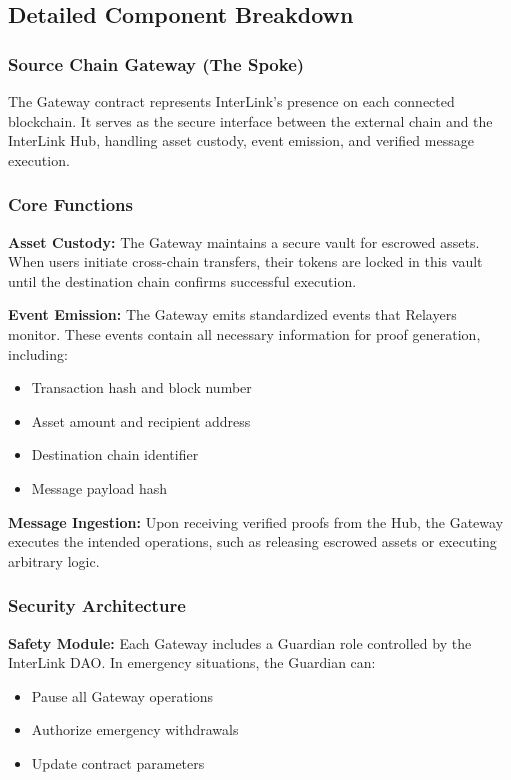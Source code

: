 \documentclass[11pt,a4paper]{article}
\begin{document}
\subsection{Detailed Component Breakdown}

\subsubsection{Source Chain Gateway (The Spoke)}

The Gateway contract represents InterLink's presence on each connected blockchain. It serves as the secure interface between the external chain and the InterLink Hub, handling asset custody, event emission, and verified message execution.

\subsubsection*{Core Functions}

\textbf{Asset Custody:} The Gateway maintains a secure vault for escrowed assets. When users initiate cross-chain transfers, their tokens are locked in this vault until the destination chain confirms successful execution.

\textbf{Event Emission:} The Gateway emits standardized events that Relayers monitor. These events contain all necessary information for proof generation, including:
\begin{itemize}
    \item Transaction hash and block number
    \item Asset amount and recipient address  
    \item Destination chain identifier
    \item Message payload hash
\end{itemize}

\textbf{Message Ingestion:} Upon receiving verified proofs from the Hub, the Gateway executes the intended operations, such as releasing escrowed assets or executing arbitrary logic.

\subsubsection*{Security Architecture}

\textbf{Safety Module:} Each Gateway includes a Guardian role controlled by the InterLink DAO. In emergency situations, the Guardian can:
\begin{itemize}
    \item Pause all Gateway operations
    \item Authorize emergency withdrawals
    \item Update contract parameters
\end{itemize}
\end{document}
